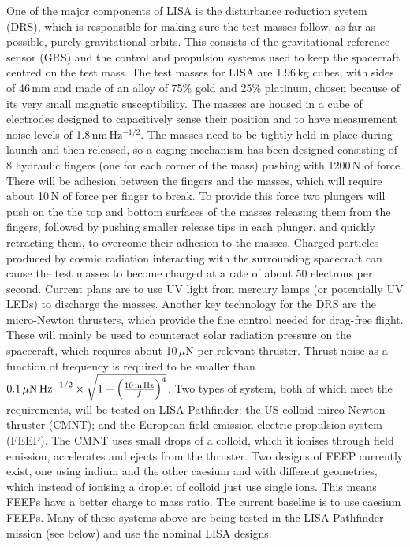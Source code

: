\documentclass{article}
\begin{document}
One of the major components of LISA is the disturbance reduction system (DRS),
which is responsible for making sure the test masses follow, as far as
possible, purely gravitational orbits. This consists of the gravitational
reference sensor (GRS) and the control and propulsion systems used to keep the
spacecraft centred on the test mass. The test masses for LISA are 1.96\,kg
cubes, with sides of 46\,mm and made of an alloy of 75\% gold and 25\% platinum,
chosen because of its very small magnetic susceptibility. The masses are housed
in a cube of electrodes designed to capacitively sense their position and
to have measurement noise levels of 1.8\,nm\,Hz$^{-1/2}$. The masses need to be
tightly held in place during launch and then released, so a caging mechanism
has been designed consisting of 8 hydraulic fingers (one for each corner of the
mass) pushing with 1200\,N of force. There will be adhesion between the fingers
and the masses, which will require about 10\,N of force per finger to break. To
provide this force two plungers will push on the the top and bottom surfaces of
the masses releasing them from the fingers, followed by pushing smaller release
tips in each plunger, and quickly retracting them, to overcome their adhesion to
the masses. Charged particles produced by cosmic radiation interacting with the
surrounding spacecraft can cause the test masses to become charged at a rate of
about 50 electrons per second. Current plans are to use UV light from mercury
lamps (or potentially UV LEDs) to discharge the masses. Another key technology
for the DRS are the micro-Newton thrusters, which provide the fine control
needed for drag-free flight. These will mainly be used to counteract solar
radiation pressure on the spacecraft, which requires about 10\,$\mu$N per
relevant thruster. Thrust noise as a function of frequency is required to be
smaller than $0.1\,\mu{\rm N}\,{\rm
Hz}^{-1/2}\times\sqrt{1+\left(\frac{10\,{\rm m}\,{\rm Hz}}{f}\right)^4}$. Two
types of system, both of which meet the requirements, will be tested on LISA
Pathfinder: the US colloid mirco-Newton thruster (CMNT); and the European field
emission electric propulsion system (FEEP). The CMNT uses small drops of a
colloid, which it ionises through field emission, accelerates and ejects from
the thruster. Two designs of FEEP currently exist, one using indium and the
other caesium and with different geometries, which instead of ionising a droplet
of colloid just use single ions. This means FEEPs have a better charge to mass
ratio. The current baseline is to use caesium FEEPs. Many of these systems above
are being tested in the LISA Pathfinder mission (see below) and use the nominal
LISA designs.
\end{document}
